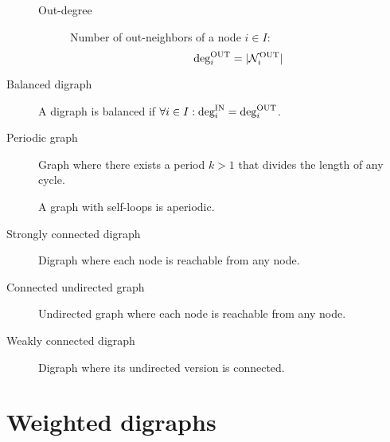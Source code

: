\begin{description}
\begin{description}
            \item[Out-degree] 
                Number of out-neighbors of a node $i \in I$:
                \[ \outdeg[i] = | \mathcal{N}_i^\text{OUT} | \] 
        \end{description}


    \item[Balanced digraph] 
        A digraph is balanced if $\forall i \in I: \indeg[i] = \outdeg[i]$.

    \item[Periodic graph] 
        Graph where there exists a period $k > 1$ that divides the length of any cycle.

        \begin{remark}
            A graph with self-loops is aperiodic.
        \end{remark}

    \item[Strongly connected digraph] 
        Digraph where each node is reachable from any node.

    \item[Connected undirected graph] 
        Undirected graph where each node is reachable from any node.    

    \item[Weakly connected digraph] 
        Digraph where its undirected version is connected.
\end{description}



\section{Weighted digraphs}

